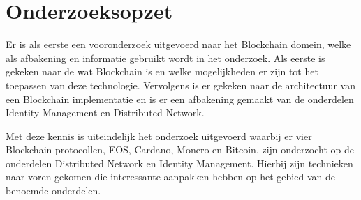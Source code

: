 \newpage
\section{Onderzoeksopzet}

Er is als eerste een vooronderzoek uitgevoerd naar het Blockchain domein, welke als afbakening en informatie gebruikt wordt in het onderzoek. Als eerste is gekeken naar de wat Blockchain is en welke mogelijkheden er zijn tot het toepassen van deze technologie. Vervolgens is er gekeken naar de architectuur van een Blockchain implementatie en is er een afbakening gemaakt van de onderdelen Identity Management en Distributed Network.

Met deze kennis is uiteindelijk het onderzoek uitgevoerd waarbij er vier Blockchain protocollen, EOS, Cardano, Monero en Bitcoin, zijn onderzocht op de onderdelen Distributed Network en Identity Management. Hierbij zijn technieken naar voren gekomen die interessante aanpakken hebben op het gebied van de benoemde onderdelen.

